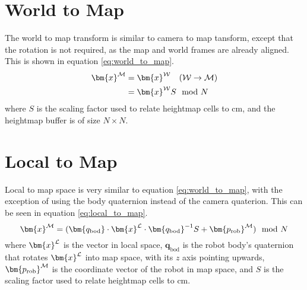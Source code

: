     \section{World to Map}
        The world to map transform is similar to camera to map tansform, except that the rotation is not required, as the map and world frames are already aligned.
        This is shown in equation \ref{eq:world_to_map}.
        \begin{align}\label{eq:world_to_map}
        \begin{split}
            \bm{x}\inrefframe{M} &= \bm{x}\inrefframe{W} \transframe{W}{M} \\
            &= \bm{x}\inrefframe{W}S \mod{N}
        \end{split}
        \end{align}
        where \(S\) is the scaling factor used to relate heightmap cells to cm, and the heightmap buffer is of size \(N\times N\).
    \section{Local to Map}
        Local to map space is very similar to equation \ref{eq:world_to_map}, with the exception of using the body quaternion instead of the camera quaterion. This can be seen in
        equation \ref{eq:local_to_map}.
        \begin{equation} \label{eq:local_to_map}
            \bm{x}\inrefframe{M} = (\bm{q_\text{bod}} \cdot \bm{x}\inrefframe{L} \cdot \bm{q_\text{bod}}^{-1}S + \bm{p_\text{rob}}\inrefframe{M}) \mod N
        \end{equation}
        where \(\bm{x}\inrefframe{L}\) is the vector in local space, \(\bm{q}_\text{bod}\) is the robot body's quaternion that rotates \(\bm{x}\inrefframe{L}\) 
        into map space, with its \(z\) axis pointing upwards, \(\bm{p_\text{rob}}\inrefframe{M}\) is the coordinate vector of the robot in map space, and \(S\) is the scaling factor
        used to relate heightmap cells to cm.

